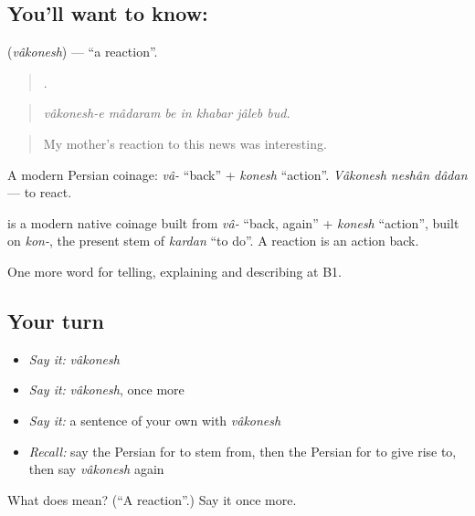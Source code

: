 \subsection*{You'll want to know: }
\textbf{} (\emph{vâkonesh}) — \textquotedblleft{}a reaction\textquotedblright{}.

\begin{quote}
      .
\end{quote}

\begin{quote}
\emph{vâkonesh-e mâdaram be in khabar jâleb bud.}
\end{quote}

\begin{quote}
My mother's reaction to this news was interesting.
\end{quote}

A modern Persian coinage: \emph{vâ-} \textquotedblleft{}back\textquotedblright{} + \emph{konesh} \textquotedblleft{}action\textquotedblright{}. \emph{Vâkonesh neshân dâdan} — to react.

\begin{cousinweb}
\textbf{} is a modern native coinage built from \emph{vâ-} \textquotedblleft{}back, again\textquotedblright{} + \emph{konesh} \textquotedblleft{}action\textquotedblright{}, built on \emph{kon-}, the present stem of \emph{kardan} \textquotedblleft{}to do\textquotedblright{}. A reaction is an action back.
\end{cousinweb}

\begin{grammarlens}[title={What you've built}]
One more word for telling, explaining and describing at B1.
\end{grammarlens}

\subsection*{Your turn}
\begin{itemize}
\raggedright
  \item \emph{Say it:} \emph{vâkonesh}
  \item \emph{Say it:} \emph{vâkonesh}, once more
  \item \emph{Say it:} a sentence of your own with \emph{vâkonesh}
  \item \emph{Recall:} say the Persian for to stem from, then the Persian for to give rise to, then say \emph{vâkonesh} again
\end{itemize}

\begin{tcolorbox}[breakable,colback=teal!4,colframe=teal!35!black,title={Before you move on}]
What does  mean? (\textquotedblleft{}A reaction\textquotedblright{}.) Say it once more.
\end{tcolorbox}
